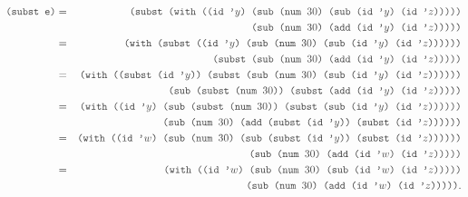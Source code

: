 \begin{eqnarray*}
  \code{(subst e)} &=& \code{(subst (with ((id '$y$) (sub (num $30$) (sub (id '$y$) (id '$z$)))))}\\
  & & \code{(sub (num $30$) (add (id '$y$) (id '$z$)))))}\\
  &=& \code{(with (subst ((id '$y$) (sub (num $30$) (sub (id '$y$) (id '$z$))))))}\\
  & & \code{(subst (sub (num $30$) (add (id '$y$) (id '$z$)))))}\\
  &=& \code{(with ((subst (id '$y$)) (subst (sub (num $30$) (sub (id '$y$) (id '$z$))))))}\\
  & & \code{(sub (subst (num $30$)) (subst (add (id '$y$) (id '$z$)))))}\\
  &=& \code{(with ((id '$y$) (sub (subst (num $30$)) (subst (sub (id '$y$) (id '$z$))))))}\\
  & & \code{(sub (num $30$) (add (subst (id '$y$)) (subst (id '$z$))))))}\\
  &=& \code{(with ((id '$w$) (sub (num $30$) (sub (subst (id '$y$)) (subst (id '$z$))))))}\\
  & & \code{(sub (num $30$) (add (id '$w$) (id '$z$)))))}\\
  &=& \code{(with ((id '$w$) (sub (num $30$) (sub (id '$w$) (id '$z$)))))}\\
  & & \code{(sub (num $30$) (add (id '$w$) (id '$z$)))))}.
\end{eqnarray*}
